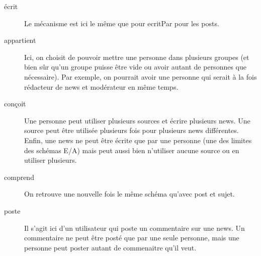 \begin{description}
	\item[écrit] Le mécanisme est ici le même que pour ecritPar pour les posts.
	\item[appartient] Ici, on choisit de pouvoir mettre une personne dans plusieurs groupes (et bien sûr qu'un groupe puisse être vide ou avoir autant de personnes que nécessaire). Par exemple, on pourrait avoir une personne qui serait à la fois rédacteur de news et modérateur en même temps. 
	\item[conçoit] Une personne peut utiliser plusieurs sources et écrire plusieurs news. Une source peut être utilisée plusieurs fois pour plusieurs news différentes. Enfin, une news ne peut être écrite que par une personne (une des limites des schémas E/A) mais peut aussi bien n'utiliser aucune source ou en utiliser plusieurs.
	\item[comprend] On retrouve une nouvelle fois le même schéma qu'avec post et sujet. 
	\item[poste] Il s'agit ici d'un utilisateur qui poste un commentaire sur une news. Un commentaire ne peut être posté que par une seule personne, mais une personne peut poster autant de commenaitre qu'il veut.
\end{description}
